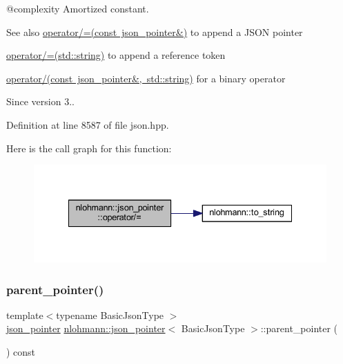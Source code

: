 @complexity Amortized constant.

\begin{DoxySeeAlso}{See also}
\mbox{\hyperlink{classnlohmann_1_1json__pointer_a7395bd0af29ac23fd3f21543c935cdfa}{operator/=(const json\+\_\+pointer\&)}} to append a J\+S\+ON pointer 

\mbox{\hyperlink{classnlohmann_1_1json__pointer_abdd21567b2b1d69329af0f520335e68b}{operator/=(std\+::string)}} to append a reference token 

\mbox{\hyperlink{classnlohmann_1_1json__pointer_a926c9065dbed1bedc17857a813f7a46f}{operator/(const json\+\_\+pointer\&, std\+::string)}} for a binary operator
\end{DoxySeeAlso}
\begin{DoxySince}{Since}
version 3.. 
\end{DoxySince}


Definition at line 8587 of file json.\+hpp.

Here is the call graph for this function\+:
\nopagebreak
\begin{figure}[H]
\begin{center}
\leavevmode
\includegraphics[width=335pt]{classnlohmann_1_1json__pointer_a64c8401529131bad1e486d91d703795f_cgraph}
\end{center}
\end{figure}
\mbox{\label{classnlohmann_1_1json__pointer_afdaacce1edb7145e0434e014f0e8685a}} 
\subsubsection{\texorpdfstring{parent\_pointer()}{parent\_pointer()}}
{\footnotesize\ttfamily template$<$typename Basic\+Json\+Type $>$ \\
\mbox{\hyperlink{classnlohmann_1_1json__pointer}{json\+\_\+pointer}} \mbox{\hyperlink{classnlohmann_1_1json__pointer}{nlohmann\+::json\+\_\+pointer}}$<$ Basic\+Json\+Type $>$\+::parent\+\_\+pointer (\begin{DoxyParamCaption}{ }\end{DoxyParamCaption}) const\hspace{0.3cm}{\ttfamily [inline]}}



